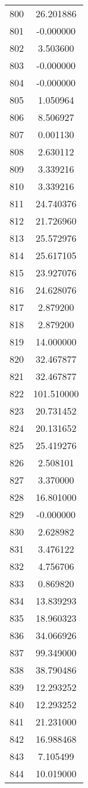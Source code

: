 \documentclass[12pt]{article}
\begin{document}
\begin{longtable}{@{}cc@{}}
800 & 26.201886 \\
801 & -0.000000 \\
802 & 3.503600 \\
803 & -0.000000 \\
804 & -0.000000 \\
805 & 1.050964 \\
806 & 8.506927 \\
807 & 0.001130 \\
808 & 2.630112 \\
809 & 3.339216 \\
810 & 3.339216 \\
811 & 24.740376 \\
812 & 21.726960 \\
813 & 25.572976 \\
814 & 25.617105 \\
815 & 23.927076 \\
816 & 24.628076 \\
817 & 2.879200 \\
818 & 2.879200 \\
819 & 14.000000 \\
820 & 32.467877 \\
821 & 32.467877 \\
822 & 101.510000 \\
823 & 20.731452 \\
824 & 20.131652 \\
825 & 25.419276 \\
826 & 2.508101 \\
827 & 3.370000 \\
828 & 16.801000 \\
829 & -0.000000 \\
830 & 2.628982 \\
831 & 3.476122 \\
832 & 4.756706 \\
833 & 0.869820 \\
834 & 13.839293 \\
835 & 18.960323 \\
836 & 34.066926 \\
837 & 99.349000 \\
838 & 38.790486 \\
839 & 12.293252 \\
840 & 12.293252 \\
841 & 21.231000 \\
842 & 16.988468 \\
843 & 7.105499 \\
844 & 10.019000 \\

\end{longtable}
\end{document}
